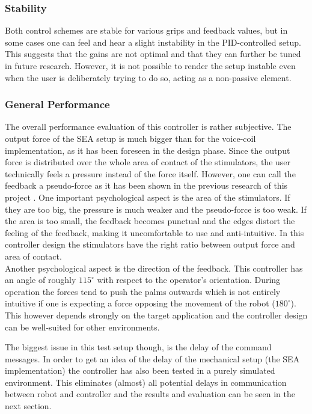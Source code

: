 \subsubsection{Stability}
Both control schemes are stable for various grips and feedback values, but in some cases one can feel and hear a slight instability in the PID-controlled setup. This suggests that the gains are not optimal and that they can further be tuned in future research. However, it is not possible to render the setup instable even when the user is deliberately trying to do so, acting as a non-passive element. 

\subsubsection{General Performance}
The overall performance evaluation of this controller is rather subjective. The output force of the SEA setup is much bigger than for the voice-coil implementation, as it has been foreseen in the design phase. Since the output force is distributed over the whole area of contact of the stimulators, the user technically feels a pressure instead of the force itself. However, one can call the feedback a pseudo-force as it has been shown in the previous research of this project \cite{Asada2016}. One important psychological aspect is the area of the stimulators. If they are too big, the pressure is much weaker and the pseudo-force is too weak. If the area is too small, the feedback becomes punctual and the edges distort the feeling of the feedback, making it uncomfortable to use and anti-intuitive. In this controller design the stimulators have the right ratio between output force and area of contact.\\
Another psychological aspect is the direction of the feedback. This controller has an angle of roughly $ 115^\circ$ with respect to the operator's orientation. During operation the forces tend to push the palms outwards which is not entirely intuitive if one is expecting a force opposing the movement of the robot ($180 ^\circ$). This however depends strongly on the target application and the controller design can be well-suited for other environments.\\ 

The biggest issue in this test setup though, is the delay of the command messages. In order to get an idea of the delay of the mechanical setup (the SEA implementation) the controller has also been tested in a purely simulated environment. This eliminates (almost) all potential delays in communication between robot and controller and the results and evaluation can be seen in the next section.

